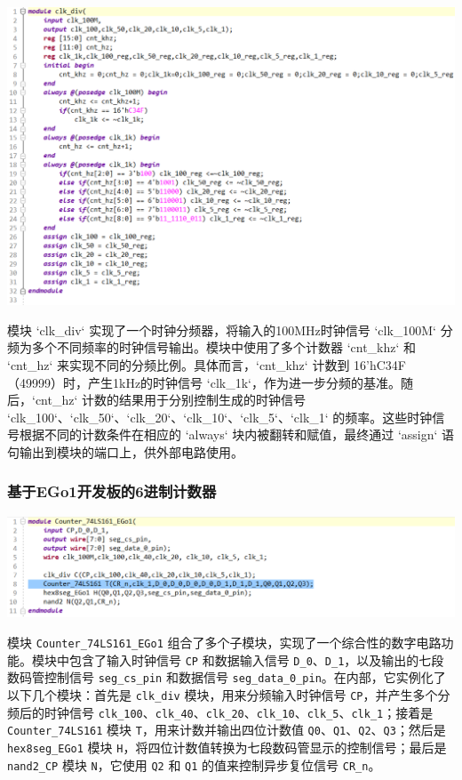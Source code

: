 \documentclass[a4,10pt,zihao=-4]{ctexart}
\begin{document}
\vspace{1em}
\noindent\includegraphics[width=1\textwidth]{clk_div_code.png}

模块 `clk\_div` 实现了一个时钟分频器，将输入的100MHz时钟信号 `clk\_100M` 分频为多个不同频率的时钟信号输出。模块中使用了多个计数器 `cnt\_khz` 和 `cnt\_hz` 来实现不同的分频比例。具体而言，`cnt\_khz` 计数到 16'hC34F（49999）时，产生1kHz的时钟信号 `clk\_1k`，作为进一步分频的基准。随后，`cnt\_hz` 计数的结果用于分别控制生成的时钟信号 `clk\_100`、`clk\_50`、`clk\_20`、`clk\_10`、`clk\_5`、`clk\_1` 的频率。这些时钟信号根据不同的计数条件在相应的 `always` 块内被翻转和赋值，最终通过 `assign` 语句输出到模块的端口上，供外部电路使用。



\subsubsection{基于EGo1开发板的6进制计数器}

\vspace{1em}
\noindent\includegraphics[width=1\textwidth]{assets/Counter_74LS161_EGo1_nand2_code.png}

模块 \texttt{Counter\_74LS161\_EGo1} 组合了多个子模块，实现了一个综合性的数字电路功能。模块中包含了输入时钟信号 \texttt{CP} 和数据输入信号 \texttt{D\_0}、\texttt{D\_1}，以及输出的七段数码管控制信号 \texttt{seg\_cs\_pin} 和数据信号 \texttt{seg\_data\_0\_pin}。在内部，它实例化了以下几个模块：首先是 \texttt{clk\_div} 模块，用来分频输入时钟信号 \texttt{CP}，并产生多个分频后的时钟信号 \texttt{clk\_100}、\texttt{clk\_40}、\texttt{clk\_20}、\texttt{clk\_10}、\texttt{clk\_5}、\texttt{clk\_1}；接着是 \texttt{Counter\_74LS161} 模块 \texttt{T}，用来计数并输出四位计数值 \texttt{Q0}、\texttt{Q1}、\texttt{Q2}、\texttt{Q3}；然后是 \texttt{hex8seg\_EGo1} 模块 \texttt{H}，将四位计数值转换为七段数码管显示的控制信号；最后是 \texttt{nand2\_CP} 模块 \texttt{N}，它使用 \texttt{Q2} 和 \texttt{Q1} 的值来控制异步复位信号 \texttt{CR\_n}。
\end{document}
